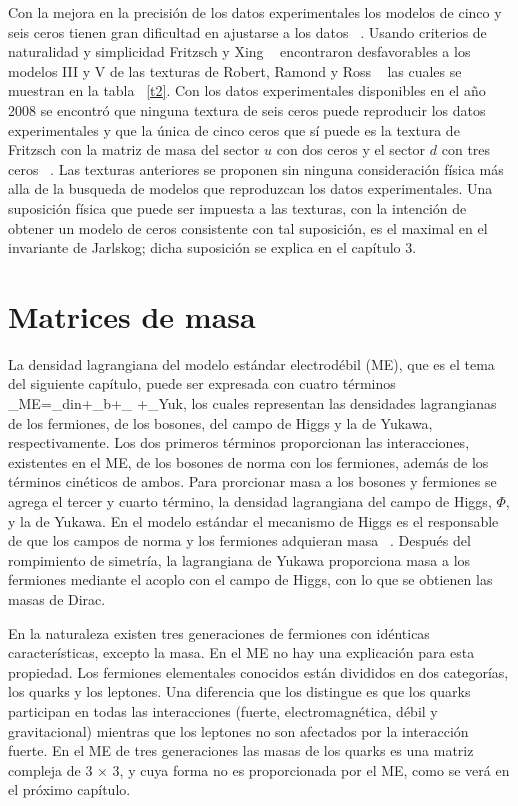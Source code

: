 Con la mejora en la precisi\'on de los datos experimentales los modelos de cinco
y seis ceros tienen gran dificultad en ajustarse a los datos ~\cite{Bra199902}. 
Usando criterios de naturalidad y simplicidad Fritzsch y Xing ~\cite{Fri200001} 
encontraron desfavorables a los modelos III y V de las texturas de
Robert, Ramond y Ross ~\cite{rrr} las cuales se muestran en la tabla ~\ref{t2}.
Con los datos experimentales disponibles en el a\~no 2008 se encontr\'o que 
ninguna textura de seis ceros puede reproducir los datos experimentales y que la
\'unica de cinco ceros que s\'i puede es la textura de Fritzsch con la matriz de
masa del sector $u$ con dos ceros y el sector $d$ con tres ceros 
~\cite{Mah200901}. Las texturas anteriores se proponen sin ninguna 
consideraci\'on f\'isica m\'as alla de la busqueda de modelos que reproduzcan 
los datos experimentales. Una suposici\'on f\'isica que puede ser impuesta a las
texturas, con la intenci\'on de obtener un modelo de ceros consistente con tal 
suposici\'on, es el maximal en el invariante de Jarlskog; dicha suposici\'on se 
explica en el cap\'itulo 3.

\section{Matrices de masa}
La densidad lagrangiana del modelo est\'andar electrod\'ebil (ME), que es el 
tema del siguiente cap\'itulo, puede ser expresada con cuatro t\'erminos  
\be\label{lme3f}
_{ME}=_{din}+_b+_{\Phi}
+_{Yuk},
\ee
los cuales representan las densidades lagrangianas de los fermiones, de los 
bosones, del campo de Higgs y la de Yukawa, respectivamente. Los dos primeros 
t\'erminos proporcionan las interacciones, existentes en el ME, de los bosones 
de norma con los fermiones, adem\'as de los t\'erminos cin\'eticos de ambos. 
Para prorcionar masa a los bosones y fermiones se agrega el tercer y cuarto
t\'ermino, la densidad lagrangiana del campo de Higgs, $\Phi$, y la de Yukawa.
En el modelo est\'andar el mecanismo de Higgs es el responsable de que los 
campos de norma y los fermiones adquieran masa ~\cite{Gri198701}. Despu\'es del 
rompimiento de simetr\'ia, la lagrangiana de Yukawa proporciona masa a los 
fermiones mediante el acoplo con el campo de Higgs, con lo que se obtienen las
masas de Dirac.

En la naturaleza existen tres generaciones de fermiones con id\'enticas 
caracter\'isticas, excepto la masa. En el ME no hay una explicaci\'on para 
esta propiedad. Los fermiones elementales conocidos est\'an divididos en 
dos categor\'ias, los quarks y los leptones. Una diferencia que los distingue 
es que los quarks participan en todas las interacciones (fuerte, 
electromagn\'etica, d\'ebil y gravitacional) mientras que los leptones no 
son afectados por la interacci\'on fuerte. En el ME de tres generaciones las 
masas de los quarks es una matriz compleja de 3 $\times$ 3, y cuya forma no es 
proporcionada por el ME, como se ver\'a en el pr\'oximo cap\'itulo.

